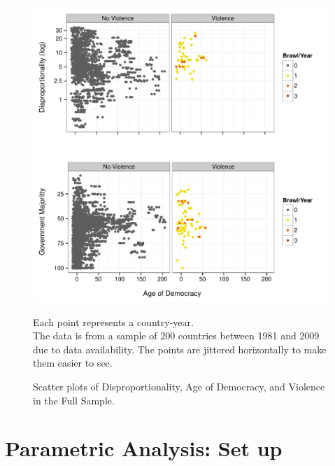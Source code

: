 \documentclass[a4paper]{article}\usepackage[]{graphicx}\usepackage[]{color}
\newenvironment{knitrout}{}{} %
\begin{document}
\begin{figure}[t]
    \caption{Scatter plots of Disproportionality, Age of Democracy, and Violence in the Full Sample.}  
    \label{framework_empirical}
    \begin{center}

\begin{knitrout}
\color{fgcolor}
\includegraphics[width=0.8\linewidth]{figure/FrameworkEmpirical} 

\end{knitrout}

    \end{center}
    \begin{singlespace}
        {\scriptsize{Each point represents a country-year. \\ The data is from a sample of 200 countries between 1981 and 2009 due to data availability. The points are jittered horizontally to make them easier to see.}}
    \end{singlespace}

\end{figure}




\section{Parametric Analysis: Set up}
\end{document}
